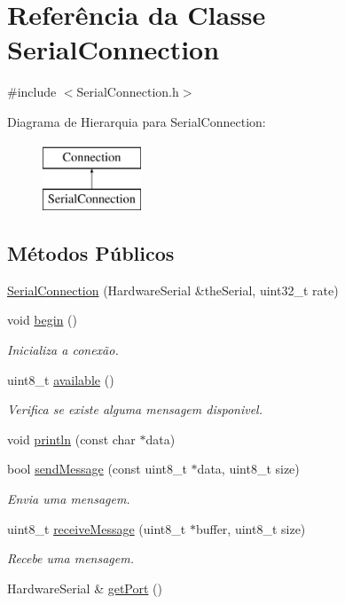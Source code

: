 \hypertarget{classSerialConnection}{\section{Referência da Classe Serial\-Connection}
\label{classSerialConnection}
}


{\ttfamily \#include $<$Serial\-Connection.\-h$>$}

Diagrama de Hierarquia para Serial\-Connection\-:\begin{figure}[H]
\begin{center}
\leavevmode
\includegraphics[height=2.000000cm]{classSerialConnection}
\end{center}
\end{figure}
\subsection*{Métodos Públicos}
\begin{DoxyCompactItemize}
\item 
\hyperlink{classSerialConnection_a05e15045efc5ea7098337f9dcd43fc82}{Serial\-Connection} (Hardware\-Serial \&the\-Serial, uint32\-\_\-t rate)
\item 
void \hyperlink{classSerialConnection_a6022b91cdd0bc412d8aeda364c32ce21}{begin} ()
\begin{DoxyCompactList}\small\item\em Inicializa a conexão. \end{DoxyCompactList}\item 
uint8\-\_\-t \hyperlink{classSerialConnection_a91aa59d8f0b913e91dc4ddcde8e42519}{available} ()
\begin{DoxyCompactList}\small\item\em Verifica se existe alguma mensagem disponivel. \end{DoxyCompactList}\item 
void \hyperlink{classSerialConnection_a85e05ec34dbb4d8d6feaccecf8ae9a72}{println} (const char $\ast$data)
\item 
bool \hyperlink{classSerialConnection_ac98733956090bc3eaa628d156f06ef5d}{send\-Message} (const uint8\-\_\-t $\ast$data, uint8\-\_\-t size)
\begin{DoxyCompactList}\small\item\em Envia uma mensagem. \end{DoxyCompactList}\item 
uint8\-\_\-t \hyperlink{classSerialConnection_ac72ec887122fe08fd389dc8724b31c63}{receive\-Message} (uint8\-\_\-t $\ast$buffer, uint8\-\_\-t size)
\begin{DoxyCompactList}\small\item\em Recebe uma mensagem. \end{DoxyCompactList}\item 
Hardware\-Serial \& \hyperlink{classSerialConnection_af5aff354718e4912d80fcee953d54540}{get\-Port} ()
\end{DoxyCompactItemize}



